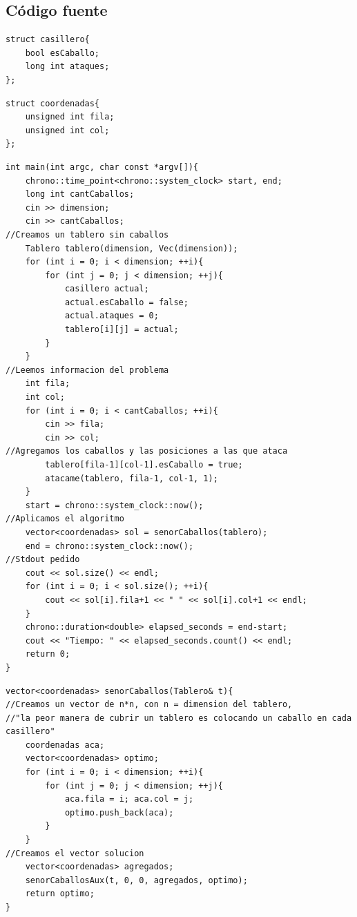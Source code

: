 \newpage

\subsection{C\'odigo fuente}
	\begin{codesnippet}
	\begin{verbatim}
struct casillero{
    bool esCaballo;
    long int ataques;
};
	\end{verbatim}
	\end{codesnippet}

	\begin{codesnippet}
	\begin{verbatim}
struct coordenadas{
    unsigned int fila;
    unsigned int col;
};
	\end{verbatim}
	\end{codesnippet}


	\begin{codesnippet}
	\begin{verbatim}
int main(int argc, char const *argv[]){
    chrono::time_point<chrono::system_clock> start, end;
    long int cantCaballos;
    cin >> dimension;
    cin >> cantCaballos;
//Creamos un tablero sin caballos
    Tablero tablero(dimension, Vec(dimension));
    for (int i = 0; i < dimension; ++i){
        for (int j = 0; j < dimension; ++j){
            casillero actual;
            actual.esCaballo = false;
            actual.ataques = 0;
            tablero[i][j] = actual;
        }
    }
//Leemos informacion del problema
    int fila;
    int col;
    for (int i = 0; i < cantCaballos; ++i){
        cin >> fila;
        cin >> col;
//Agregamos los caballos y las posiciones a las que ataca
        tablero[fila-1][col-1].esCaballo = true;
        atacame(tablero, fila-1, col-1, 1);
    }
    start = chrono::system_clock::now();
//Aplicamos el algoritmo
    vector<coordenadas> sol = senorCaballos(tablero);
    end = chrono::system_clock::now();
//Stdout pedido
    cout << sol.size() << endl;
    for (int i = 0; i < sol.size(); ++i){
        cout << sol[i].fila+1 << " " << sol[i].col+1 << endl;
    }
    chrono::duration<double> elapsed_seconds = end-start;
    cout << "Tiempo: " << elapsed_seconds.count() << endl;
    return 0;
}
	\end{verbatim}
	\end{codesnippet}
\newpage
	\begin{codesnippet}
	\begin{verbatim}
vector<coordenadas> senorCaballos(Tablero& t){
//Creamos un vector de n*n, con n = dimension del tablero, 
//"la peor manera de cubrir un tablero es colocando un caballo en cada casillero"
    coordenadas aca;
    vector<coordenadas> optimo;
    for (int i = 0; i < dimension; ++i){
        for (int j = 0; j < dimension; ++j){
            aca.fila = i; aca.col = j;
            optimo.push_back(aca);
        }
    }
//Creamos el vector solucion
    vector<coordenadas> agregados;
    senorCaballosAux(t, 0, 0, agregados, optimo);
    return optimo;
}
	\end{verbatim}
	\end{codesnippet}

